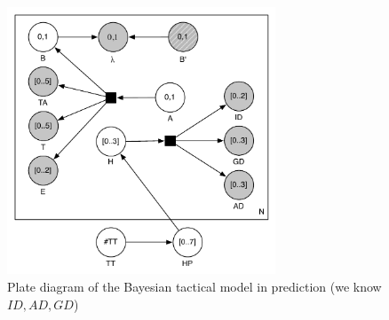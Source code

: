 \begin{figure}[ht]
\begin{center}
\includegraphics[width=8cm]{images/SpecialTactics_plate.pdf}
\caption{Plate diagram of the Bayesian tactical model in prediction (we know $ID, AD, GD$)}
\label{fig:SpecialTactics_plate}
\end{center}
\end{figure}

